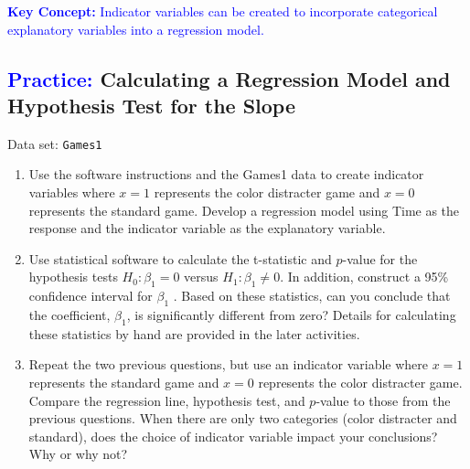 \documentclass[
]{report}
\begin{document}
\textbf{\textcolor{blue}{Key Concept:}}
\textcolor{blue}{Indicator variables can be created to incorporate categorical explanatory variables into a regression model.}

\hypertarget{calculating-a-regression-model-and-hypothesis-test-for-the-slope}{%
\subsection*{\texorpdfstring{\textcolor{blue}{Practice:} Calculating a Regression Model and Hypothesis Test for the Slope}{ Calculating a Regression Model and Hypothesis Test for the Slope}}\label{calculating-a-regression-model-and-hypothesis-test-for-the-slope}}

\vspace{-1em}

Data set: \texttt{Games1}

\begin{enumerate}
\def\labelenumi{\arabic{enumi}.}
\setcounter{enumi}{10}
\item
  Use the software instructions and the Games1 data to create indicator variables where \(\scriptstyle x = 1\) represents the color distracter game and \(\scriptstyle x = 0\) represents the standard game. Develop a regression model using Time as the response and the indicator variable as the explanatory variable.
\item
  Use statistical software to calculate the t-statistic and \(\scriptstyle p\)-value for the hypothesis tests \(\scriptstyle H_0 : \beta_1 = 0\) versus \(\scriptstyle H_1 : \beta_1 \ne 0\). In addition, construct a 95\% confidence interval for \(\scriptstyle \beta_1\) . Based on these statistics, can you conclude that the coefficient, \(\scriptstyle \beta_1\), is significantly different from zero? Details for calculating these statistics by hand are provided in the later activities.
\item
  Repeat the two previous questions, but use an indicator variable where \(\scriptstyle x = 1\) represents the standard game and \(\scriptstyle x = 0\) represents the color distracter game. Compare the regression line, hypothesis test, and \(\scriptstyle p\)-value to those from the previous questions. When there are only two categories (color distracter and standard), does the choice of indicator variable impact your conclusions? Why or why not?
\end{enumerate}
\end{document}

